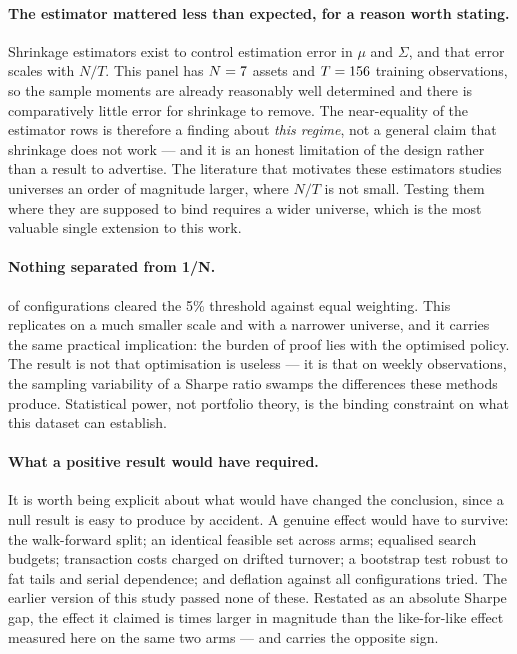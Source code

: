 \paragraph{The estimator mattered less than expected, for a reason worth stating.}
Shrinkage estimators exist to control estimation error in $\mu$ and $\Sigma$, and
that error scales with $N/T$. This panel has $N = 7{}$ assets and
$T = 156{}$ training observations, so the sample moments are already
reasonably well determined and there is comparatively little error for shrinkage
to remove. The near-equality of the estimator rows is therefore a finding about
\emph{this regime}, not a general claim that shrinkage does not work --- and it is
an honest limitation of the design rather than a result to advertise. The
literature that motivates these estimators \citep{ledoit2004, jorion1986} studies
universes an order of magnitude larger, where $N/T$ is not small. Testing them
where they are supposed to bind requires a wider universe, which is the most
valuable single extension to this work.

\paragraph{Nothing separated from 1/N.} \nBeatingBenchmark{} of \nStrategies{}
configurations cleared the 5\% threshold against equal weighting. This replicates
\citet{demiguel2009} on a much smaller scale and with a narrower universe, and it
carries the same practical implication: the burden of proof lies with the
optimised policy. The result is not that optimisation is useless --- it is that on
\oosPeriods{} weekly observations, the sampling variability of a Sharpe ratio
swamps the differences these methods produce. Statistical power, not portfolio
theory, is the binding constraint on what this dataset can establish.

\paragraph{What a positive result would have required.} It is worth being explicit
about what would have changed the conclusion, since a null result is easy to
produce by accident. A genuine effect would have to survive: the walk-forward
split; an identical feasible set across arms; equalised search budgets;
transaction costs charged on drifted turnover; a bootstrap test robust to fat
tails and serial dependence; and deflation against all \nTrials{} configurations
tried. The earlier version of this study passed none of these. Restated as an
absolute Sharpe gap, the effect it claimed is \claimRatio{} times larger in
magnitude than the like-for-like effect measured here on the same two arms --- and
carries the opposite sign.
